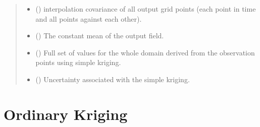 \documentclass[letterpaper,10pt,english]{sphinxmanual}
\begin{document}
\begin{fulllineitems}
\begin{quote}
\begin{description}
\begin{itemize}
\item {}
\sphinxAtStartPar
{} (\sphinxstyleliteralemphasis{\sphinxupquote{{[}}}\sphinxstyleliteralemphasis{\sphinxupquote{{]}}}) \textendash{} interpolation covariance of all output grid points (each point in time
and all points against each other).

\item {}
\sphinxAtStartPar
{} () \textendash{} The constant mean of the output field.

\end{itemize}

\sphinxAtStartPar
{}

\sphinxAtStartPar
\begin{itemize}
\item {}
\sphinxAtStartPar
{} () \textendash{} Full set of values for the whole domain derived from the observation
points using simple kriging.

\item {}
\sphinxAtStartPar
{} () \textendash{} Uncertainty associated with the simple kriging.

\end{itemize}


\end{description}\end{quote}

\end{fulllineitems}



\section{Ordinary Kriging}
\label{\detokenize{kriging:ordinary-kriging}}
\end{document}
